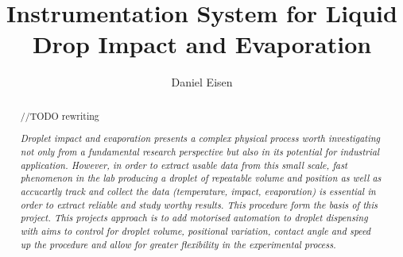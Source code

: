 \documentclass[11pt, a4paper, twoside, openright]{report}
\title{Instrumentation System for Liquid Drop Impact and Evaporation}
\author{Daniel Eisen}
\date{}
\begin{document}
\frontmatter

\begin{abstract}
    //TODO rewriting
    
    \textit{Droplet impact and evaporation presents a complex physical process worth investigating not only from a fundamental research perspective but also in its potential for industrial application. However, in order to extract usable data from this small scale, fast phenomenon in the lab producing a droplet of repeatable volume and position as well as accucartly track and collect the data (temperature, impact, evaporation) is essential in order to extract reliable and study worthy results. This procedure form the basis of this project.
    This projects approach is to add motorised automation to droplet dispensing with aims to control for droplet volume, positional variation, contact angle and speed up the procedure and allow for greater flexibility in the experimental process.}


\end{abstract}


\maketitle



\tableofcontents

\mainmatter









\backmatter





\end{document}
